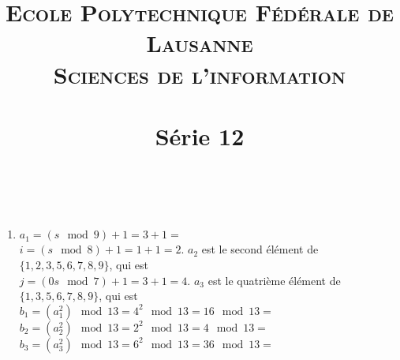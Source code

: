 \documentclass[10p,a4paper]{scrartcl}
\title{	
	\normalfont \normalsize 
	\textsc{Ecole Polytechnique Fédérale de Lausanne} \\ [25pt] %
	\textsc{Sciences de l'information}\\ [0pt] %
	\horrule{0.5pt} \\[0.4cm] %
	\huge Série 12 \\ %
	\horrule{2pt} \\[0.5cm] %
}
\date{}
\renewcommand{\(}{\left(}
\renewcommand{\)}{\right)}
\begin{document}
\maketitle
\setcounter{section}{12}
\subsection{}
\begin{enumerate}
	\item	$a_1 = (s \mod 9)+ 1 = 3 + 1 =$ \\
			$i = (s \mod 8) + 1 = 1+1 = 2$. $a_2$ est le second élément de $\{1,2,3,5,6,7,8,9\}$, qui est \\
			$j = (0s \mod 7) + 1 = 3+1 = 4$. $a_3$ est le quatrième élément de $\{1,3,5,6,7,8,9\}$, qui est \\
			$b_1 = (a_1^2) \mod 13 = 4^2 \mod 13 = 16\mod 13 =$ \\
			$b_2 = (a_2^2) \mod 13 = 2^2 \mod 13 = 4 \mod 13 =$ \\
			$b_3 = (a_3^2) \mod 13 = 6^2 \mod 13 = 36\mod 13 =$ 
			

\end{enumerate}
\end{document}
